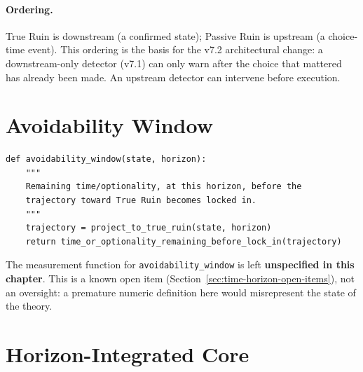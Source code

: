

\paragraph{Ordering.} True Ruin is downstream (a confirmed state);
Passive Ruin is upstream (a choice-time event). This ordering is the
basis for the v7.2 architectural change: a downstream-only detector
(v7.1) can only warn after the choice that mattered has already been
made. An upstream detector can intervene before execution.

\section{Avoidability Window}
\label{sec:time-horizon-window}

\begin{lstlisting}[basicstyle=\ttfamily\small,frame=single]
def avoidability_window(state, horizon):
    """
    Remaining time/optionality, at this horizon, before the
    trajectory toward True Ruin becomes locked in.
    """
    trajectory = project_to_true_ruin(state, horizon)
    return time_or_optionality_remaining_before_lock_in(trajectory)
\end{lstlisting}

The measurement function for \texttt{avoidability\_window} is left
\textbf{unspecified in this chapter}. This is a known open item
(Section~\ref{sec:time-horizon-open-items}), not an oversight: a
premature numeric definition here would misrepresent the state of
the theory.

\section{Horizon-Integrated Core}
\label{sec:time-horizon-core-integration}

